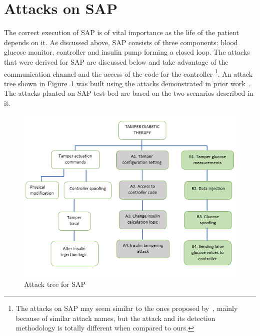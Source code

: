 \section{Attacks on \ac{SAP}}
The correct execution of \ac{SAP} is of vital importance as the life of the patient depends on it. As discussed above, \ac{SAP} consists of three components: blood glucose monitor, controller and insulin pump forming a closed loop. The attacks that were derived for \ac{SAP} are discussed below and take advantage of the communication channel and the access of the code for the controller \footnote{The attacks on \ac{SAP} may seem similar to the ones proposed by~\cite{aliabadi2017artinali}, mainly because of similar attack names, but the attack and its detection methodology is totally different when compared to ours.}. An attack tree shown in Figure~\ref{fig:attackTreeOpenAPS} was built using the attacks demonstrated in prior work~\cite{aliabadi2017artinali, radcliffe2011hacking}. The attacks planted on \ac{SAP} test-bed are based on the two scenarios described in it.
\begin{figure}[ht]
    \centering
    \includegraphics[scale=0.55,keepaspectratio = true]{Graphics/AttackTreeSAPNew.png}
    \caption{Attack tree for SAP}
    \label{fig:attackTreeOpenAPS}
\end{figure}


